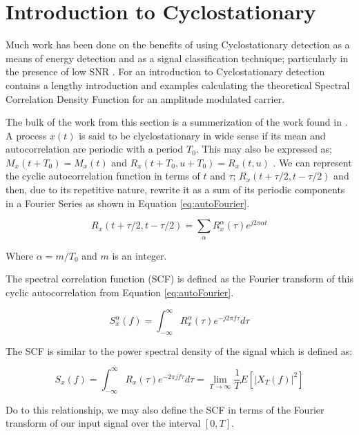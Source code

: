 \chapter{Introduction to Cyclostationary}

Much work has been done on the benefits of using Cyclostationary detection as a
means of energy detection and as a signal classification
technique; particularly in the presence of low SNR \cite{kim2007}.  For an
introduction to Cyclostationary detection \cite{costa1996} contains a lengthy introduction and
examples calculating the theoretical Spectral Correlation Density Function for
an amplitude modulated carrier.

The bulk of the work from this section is a summerization of the work found in
\cite{kim2007}.  A process $x(t)$ is said to be clyclostationary in wide sense
if its mean and autocorrelation are periodic with a period $T_0$.  This may also be expressed as; $M_x(t+T_0) = M_x(t)$ and $R_x(t+T_0, u + T_0) = R_x(t,u)$ \cite{kim2007}. 
We can represent the cyclic autocorrelation function in terms of $t$ and
$\tau$; $R_x(t+\tau/2, t-\tau/2)$ and then, due to its repetitive nature,
rewrite it as a sum of its periodic components in a Fourier Series as shown in
Equation \ref{eq:autoFourier}.

\begin{equation}
R_x(t+\tau/2, t- \tau/2) = \sum_{\alpha} R_x^{\alpha}(\tau)e^{j2\pi \alpha t}
\label{eq:autoFourier}
\end{equation}

Where $\alpha = m/T_0$ and $m$ is an integer. 

The spectral correlation function (SCF) is defined as the Fourier transform of
this cyclic autocorrelation from Equation \ref{eq:autoFourier}.

\begin{equation}
S_x^{\alpha}(f) = \int_{-\infty}^{\infty} R_x^{\alpha}(\tau)e^{-j2\pi f \tau} d\tau
\label{eq:ScdDefined}
\end{equation}

The SCF is similar to the power spectral density of the signal which is defined
as: 

\begin{equation}
S_x(f) = \int_{-\infty}^{\infty} R_x(\tau)e^{-2\pi j f \tau} d\tau = \lim_{T \to \infty} \frac{1}{T}E[|X_T(f)|^2]
\label{eq:PSDDef}
\end{equation}


Do to this relationship, we may also define the SCF in terms of the Fourier
transform of our input signal over the interval $[0, T]$.

